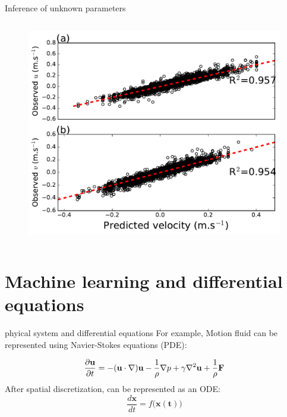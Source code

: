 \documentclass[handout]{beamer}
\begin{document}
\begin{frame}{Inference of unknown parameters}
\begin{columns}
\begin{figure}
          \includegraphics[width=\textwidth]{fig/L3/Scatter_uv_obs_vs_predict_resize.pdf}
    \end{figure}
        \end{columns}
    \end{frame}

\section{Machine learning and differential equations}
\begin{frame}{phyical system and differential equations}
    For example, Motion fluid can be represented using Navier-Stokes equations (PDE):
    
    $$ {\partial{\bf u}\over{\partial t}} = -  ({\bf u} \cdot \nabla) {\bf u} - {1\over\rho} \nabla p + \gamma\nabla^2{\bf u} + {1\over\rho}{\bf F} 
    $$
    \pause
    After spatial discretization, can be represented as an ODE:
    $$
    \frac{d\mathbf{x}}{dt} = f(\mathbf{x(t))}
    $$
\end{frame}
\end{document}

